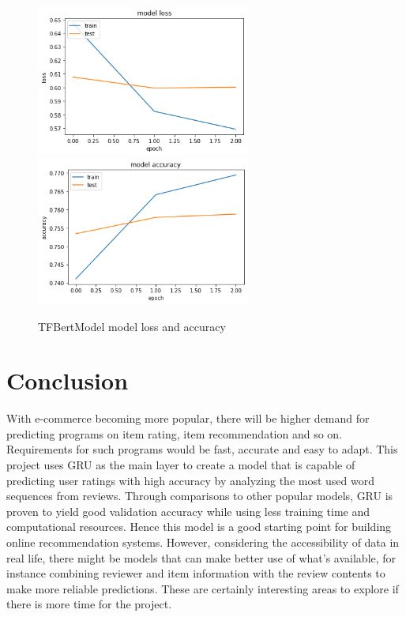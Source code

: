 \documentclass[12pt]{article}
\begin{document}
\begin{figure}[h!]
    \centering
    \includegraphics[width=70mm,scale=0.5]{trans_loss.png}
    \includegraphics[width=70mm,scale=0.5]{trans_acc.png}
    \caption{TFBertModel model loss and accuracy}
    \label{fig:tr}
    \vspace{-0.5cm}
\end{figure}
\section{Conclusion}
With e-commerce becoming more popular, there will be higher demand for predicting programs on item rating, item recommendation and so on. Requirements for such programs would be fast, accurate and easy to adapt. This project uses GRU as the main layer to create a model that is capable of predicting user ratings with high accuracy by analyzing the most used word sequences from reviews. Through comparisons to other popular models, GRU is proven to yield good validation accuracy while using less training time and computational resources. Hence this model is a good starting point for building online recommendation systems. However, considering the accessibility of data in real life, there might be models that can make better use of what’s available, for instance combining reviewer and item information with the review contents to make more reliable predictions. These are certainly interesting areas to explore if there is more time for the project.
\end{document}
